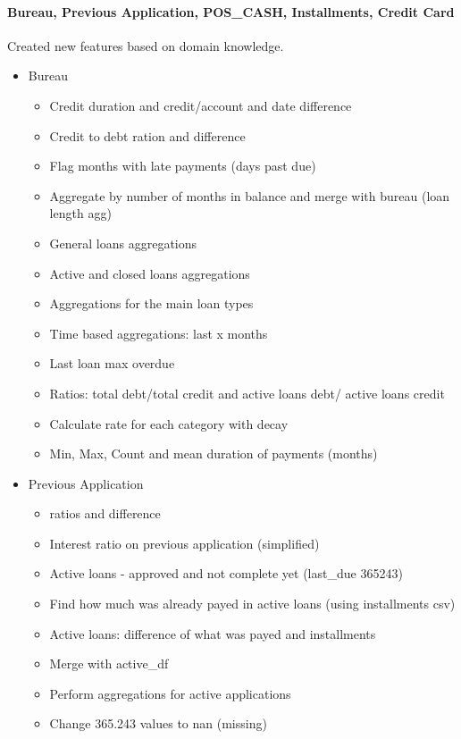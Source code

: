 \documentclass[twoside,a4paper]{article}
\begin{document}
\paragraph{Bureau, Previous Application, POS\_CASH, Installments, Credit Card}
Created new features based on domain knowledge.
\begin{itemize}
    \item Bureau
    \begin{itemize}
        \item Credit duration and credit/account and date difference
        \item Credit to debt ration and difference
        \item Flag months with late payments (days past due)
        \item Aggregate by number of months in balance and merge with bureau (loan length agg)
        \item General loans aggregations
        \item Active and closed loans aggregations
        \item Aggregations for the main loan types
        \item Time based aggregations: last x months
        \item Last loan max overdue
        \item Ratios: total debt/total credit and active loans debt/ active loans credit
        \item Calculate rate for each category with decay
        \item Min, Max, Count and mean duration of payments (months)
    \end{itemize}
    \item Previous Application
    \begin{itemize}
        \item ratios and difference
        \item Interest ratio on previous application (simplified)
        \item Active loans - approved and not complete yet (last\_due 365243)
        \item Find how much was already payed in active loans (using installments csv)
        \item Active loans: difference of what was payed and installments
        \item Merge with active\_df
        \item Perform aggregations for active applications
        \item Change 365.243 values to nan (missing)

\end{itemize}
\end{itemize}
\end{document}
